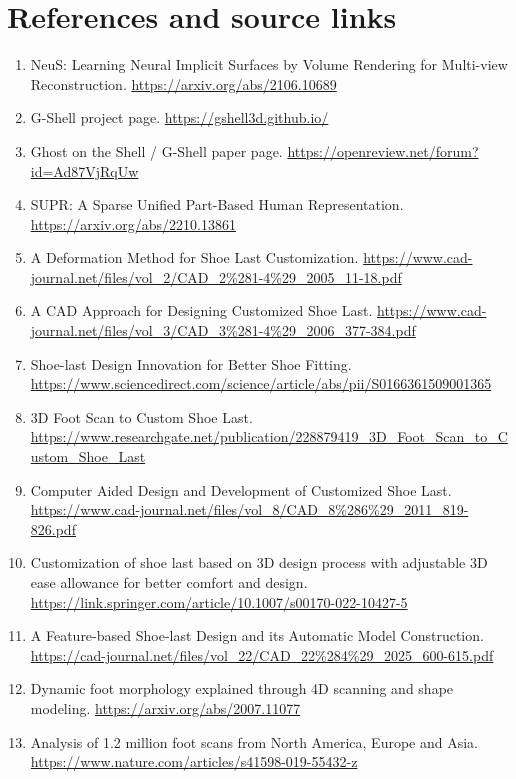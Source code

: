 \documentclass[
  10.5pt,
]{article}
\providecommand{\tightlist}{%
  \setlength{\itemsep}{0pt}\setlength{\parskip}{0pt}}
\begin{document}
\section{References and source links}\label{references-and-source-links}

\begin{enumerate}
\def\labelenumi{\arabic{enumi}.}
\tightlist
\item
  NeuS: Learning Neural Implicit Surfaces by Volume Rendering for
  Multi-view Reconstruction. \url{https://arxiv.org/abs/2106.10689}
\item
  G-Shell project page. \url{https://gshell3d.github.io/}
\item
  Ghost on the Shell / G-Shell paper page.
  \url{https://openreview.net/forum?id=Ad87VjRqUw}
\item
  SUPR: A Sparse Unified Part-Based Human Representation.
  \url{https://arxiv.org/abs/2210.13861}
\item
  A Deformation Method for Shoe Last Customization.
  \url{https://www.cad-journal.net/files/vol_2/CAD_2\%281-4\%29_2005_11-18.pdf}
\item
  A CAD Approach for Designing Customized Shoe Last.
  \url{https://www.cad-journal.net/files/vol_3/CAD_3\%281-4\%29_2006_377-384.pdf}
\item
  Shoe-last Design Innovation for Better Shoe Fitting.
  \url{https://www.sciencedirect.com/science/article/abs/pii/S0166361509001365}
\item
  3D Foot Scan to Custom Shoe Last.
  \url{https://www.researchgate.net/publication/228879419_3D_Foot_Scan_to_Custom_Shoe_Last}
\item
  Computer Aided Design and Development of Customized Shoe Last.
  \url{https://www.cad-journal.net/files/vol_8/CAD_8\%286\%29_2011_819-826.pdf}
\item
  Customization of shoe last based on 3D design process with adjustable
  3D ease allowance for better comfort and design.
  \url{https://link.springer.com/article/10.1007/s00170-022-10427-5}
\item
  A Feature-based Shoe-last Design and its Automatic Model Construction.
  \url{https://cad-journal.net/files/vol_22/CAD_22\%284\%29_2025_600-615.pdf}
\item
  Dynamic foot morphology explained through 4D scanning and shape
  modeling. \url{https://arxiv.org/abs/2007.11077}
\item
  Analysis of 1.2 million foot scans from North America, Europe and
  Asia. \url{https://www.nature.com/articles/s41598-019-55432-z}

\end{enumerate}
\end{document}
